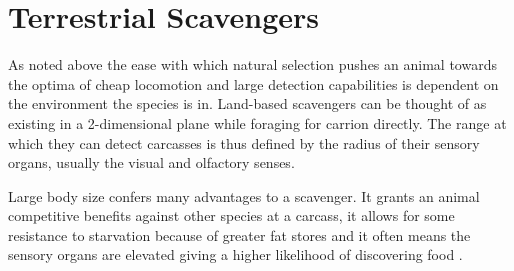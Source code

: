\documentclass[a4paper,12pt]{article}
\begin{document}




\section{Terrestrial Scavengers}
As noted above the ease with which natural selection pushes an animal towards the optima of cheap locomotion and large detection capabilities is dependent on the environment the species is in. 
Land-based scavengers can be thought of as existing in a 2-dimensional plane while foraging for carrion directly. 
The range at which they can detect carcasses is thus defined by the radius of their sensory organs, usually the visual and olfactory senses. 

Large body size confers many advantages to a scavenger. 
It grants an animal competitive benefits against other species at a carcass, it allows for some resistance to starvation because of greater fat stores and it often means the sensory organs are elevated giving a higher likelihood of discovering food \citep{farlow1994speculations}.
\end{document}
